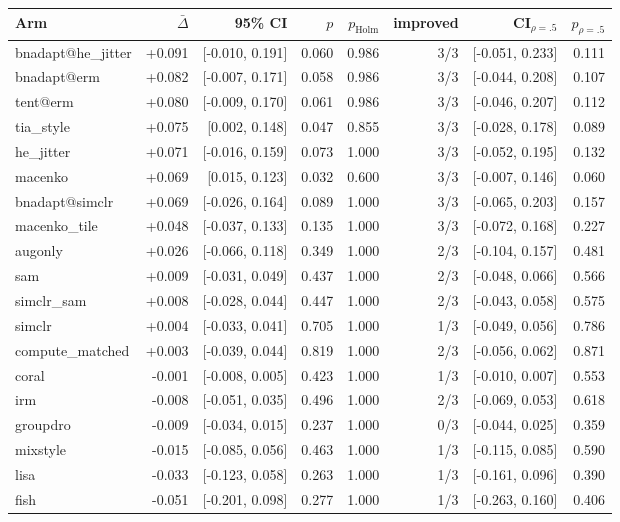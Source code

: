 \begin{tabular}{lrrrrrrr}
\toprule
Arm & $\bar\Delta$ & 95\% CI & $p$ & $p_\text{Holm}$ & improved & CI$_{\rho=.5}$ & $p_{\rho=.5}$ \\
\midrule
bnadapt@he\_jitter & +0.091 & [-0.010, 0.191] & 0.060 & 0.986 & 3/3 & [-0.051, 0.233] & 0.111 \\
bnadapt@erm & +0.082 & [-0.007, 0.171] & 0.058 & 0.986 & 3/3 & [-0.044, 0.208] & 0.107 \\
tent@erm & +0.080 & [-0.009, 0.170] & 0.061 & 0.986 & 3/3 & [-0.046, 0.207] & 0.112 \\
tia\_style & +0.075 & [0.002, 0.148] & 0.047 & 0.855 & 3/3 & [-0.028, 0.178] & 0.089 \\
he\_jitter & +0.071 & [-0.016, 0.159] & 0.073 & 1.000 & 3/3 & [-0.052, 0.195] & 0.132 \\
macenko & +0.069 & [0.015, 0.123] & 0.032 & 0.600 & 3/3 & [-0.007, 0.146] & 0.060 \\
bnadapt@simclr & +0.069 & [-0.026, 0.164] & 0.089 & 1.000 & 3/3 & [-0.065, 0.203] & 0.157 \\
macenko\_tile & +0.048 & [-0.037, 0.133] & 0.135 & 1.000 & 3/3 & [-0.072, 0.168] & 0.227 \\
augonly & +0.026 & [-0.066, 0.118] & 0.349 & 1.000 & 2/3 & [-0.104, 0.157] & 0.481 \\
sam & +0.009 & [-0.031, 0.049] & 0.437 & 1.000 & 2/3 & [-0.048, 0.066] & 0.566 \\
simclr\_sam & +0.008 & [-0.028, 0.044] & 0.447 & 1.000 & 2/3 & [-0.043, 0.058] & 0.575 \\
simclr & +0.004 & [-0.033, 0.041] & 0.705 & 1.000 & 1/3 & [-0.049, 0.056] & 0.786 \\
compute\_matched & +0.003 & [-0.039, 0.044] & 0.819 & 1.000 & 2/3 & [-0.056, 0.062] & 0.871 \\
coral & -0.001 & [-0.008, 0.005] & 0.423 & 1.000 & 1/3 & [-0.010, 0.007] & 0.553 \\
irm & -0.008 & [-0.051, 0.035] & 0.496 & 1.000 & 2/3 & [-0.069, 0.053] & 0.618 \\
groupdro & -0.009 & [-0.034, 0.015] & 0.237 & 1.000 & 0/3 & [-0.044, 0.025] & 0.359 \\
mixstyle & -0.015 & [-0.085, 0.056] & 0.463 & 1.000 & 1/3 & [-0.115, 0.085] & 0.590 \\
lisa & -0.033 & [-0.123, 0.058] & 0.263 & 1.000 & 1/3 & [-0.161, 0.096] & 0.390 \\
fish & -0.051 & [-0.201, 0.098] & 0.277 & 1.000 & 1/3 & [-0.263, 0.160] & 0.406 \\
\bottomrule
\end{tabular}
